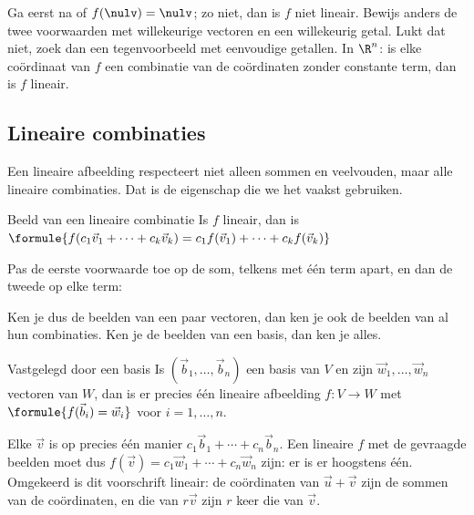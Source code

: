 \begin{werkwijze}
Ga eerst na of $f(\nulv) = \nulv$; zo niet, dan is $f$ niet lineair. Bewijs anders de twee voorwaarden met willekeurige vectoren en een willekeurig getal. Lukt dat niet, zoek dan een tegenvoorbeeld met eenvoudige getallen. In $\R^n$: is elke coördinaat van $f$ een combinatie van de coördinaten zonder constante term, dan is $f$ lineair.
\end{werkwijze}

\begin{oefeningen}
\end{oefeningen}

\subsection{Lineaire combinaties}

Een lineaire afbeelding respecteert niet alleen sommen en veelvouden, maar alle lineaire combinaties. Dat is de eigenschap die we het vaakst gebruiken.

\begin{theorie}
\begin{stelling}{Beeld van een lineaire combinatie}
Is $f$ lineair, dan is \quad $\formule{f(c_1\vec v_1 + \cdots + c_k\vec v_k) = c_1 f(\vec v_1) + \cdots + c_k f(\vec v_k)}$
\end{stelling}

\begin{bewijs}
Pas de eerste voorwaarde toe op de som, telkens met één term apart, en dan de tweede op elke term:
\end{bewijs}
\end{theorie}

Ken je dus de beelden van een paar vectoren, dan ken je ook de beelden van al hun combinaties. Ken je de beelden van een basis, dan ken je alles.

\begin{theorie}
\begin{stelling}{Vastgelegd door een basis}
Is $(\vec b_1, \ldots, \vec b_n)$ een basis van $V$ en zijn $\vec w_1, \ldots, \vec w_n$ vectoren van $W$, dan is er precies één lineaire afbeelding $f \colon V \to W$ met $\formule{f(\vec b_i) = \vec w_i}$ voor $i = 1, \ldots, n$.
\end{stelling}

\begin{bewijs}
Elke $\vec v$ is op precies één manier $c_1\vec b_1 + \cdots + c_n\vec b_n$. Een lineaire $f$ met de gevraagde beelden moet dus $f(\vec v) = c_1\vec w_1 + \cdots + c_n\vec w_n$ zijn: er is er hoogstens één. Omgekeerd is dit voorschrift lineair: de coördinaten van $\vec u + \vec v$ zijn de sommen van de coördinaten, en die van $r\vec v$ zijn $r$ keer die van $\vec v$.
\end{bewijs}
\end{theorie}

